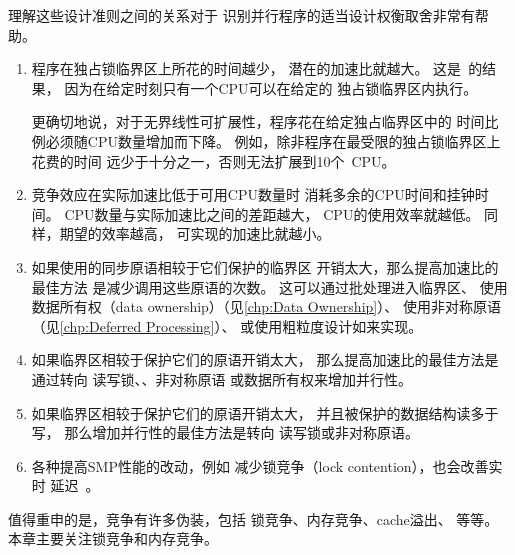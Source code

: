 理解这些设计准则之间的关系对于
识别并行程序的适当设计权衡取舍非常有帮助。
\begin{enumerate}
\item	程序在独占锁临界区上所花的时间越少，
	潜在的加速比就越大。
	这是~\cite{GeneAmdahl1967AmdahlsLaw}的结果，
	因为在给定时刻只有一个CPU可以在给定的
	独占锁临界区内执行。

	更确切地说，对于无界线性可扩展性，程序花在给定独占临界区中的
	时间比例必须随CPU数量增加而下降。
	例如，除非程序在最受限的独占锁临界区上花费的时间
	远少于十分之一，否则无法扩展到10个~CPU。
\item	竞争效应在实际加速比低于可用CPU数量时
	消耗多余的CPU时间和挂钟时间。
	CPU数量与实际加速比之间的差距越大，
	CPU的使用效率就越低。
	同样，期望的效率越高，
	可实现的加速比就越小。
\item	如果使用的同步原语相较于它们保护的临界区
	开销太大，那么提高加速比的最佳方法
	是减少调用这些原语的次数。
	这可以通过批处理进入临界区、
	使用数据所有权（data ownership）（见\cref{chp:Data Ownership}）、
	使用非对称原语
	（见\cref{chp:Deferred Processing}）、
	或使用粗粒度设计如来实现。
\item	如果临界区相较于保护它们的原语开销太大，
	那么提高加速比的最佳方法是通过转向
	读写锁、、非对称原语
	或数据所有权来增加并行性。
\item	如果临界区相较于保护它们的原语开销太大，
	并且被保护的数据结构读多于写，
	那么增加并行性的最佳方法是转向
	读写锁或非对称原语。
\item	各种提高SMP性能的改动，例如
	减少锁竞争（lock contention），也会改善实时
	延迟~\cite{PaulMcKenney2005h}。
\end{enumerate}

\QuickQuizEnd

值得重申的是，竞争有许多伪装，包括
锁竞争、内存竞争、cache溢出、
等等。
本章主要关注锁竞争和内存竞争。
